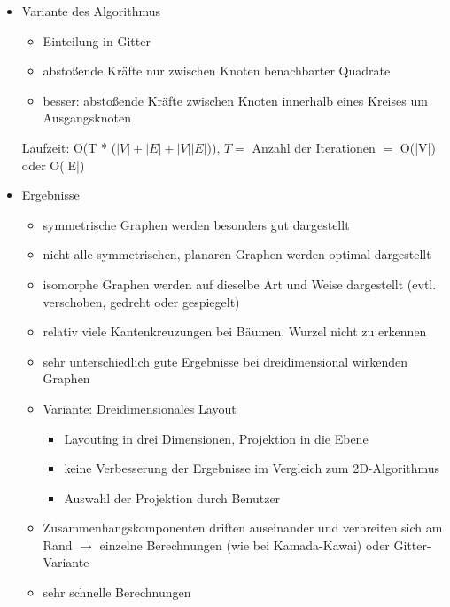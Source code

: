 \documentclass[a4paper,12pt,ngerman]{scrartcl}
\begin{document}
\begin{itemize}
\item Variante des Algorithmus
\begin{itemize}
\item Einteilung in Gitter
\item abstoßende Kräfte nur zwischen Knoten benachbarter Quadrate
\item besser: abstoßende Kräfte zwischen Knoten innerhalb eines Kreises um Ausgangsknoten
\end{itemize}

Laufzeit: O(T * ($|V| + |E| + |V||E|$)), $T =$ Anzahl der Iterationen $=$ O(|V|) oder O(|E|)
\item Ergebnisse
\begin{itemize}
\item symmetrische Graphen werden besonders gut dargestellt
\item nicht alle symmetrischen, planaren Graphen werden optimal dargestellt
\item isomorphe Graphen werden auf dieselbe Art und Weise dargestellt (evtl. verschoben, gedreht oder gespiegelt)
\item relativ viele Kantenkreuzungen bei Bäumen, Wurzel nicht zu erkennen
\item sehr unterschiedlich gute Ergebnisse bei dreidimensional wirkenden Graphen
\item Variante: Dreidimensionales Layout
\begin{itemize}
\item Layouting in drei Dimensionen, Projektion in die Ebene
\item keine Verbesserung der Ergebnisse im Vergleich zum 2D-Algorithmus
\item Auswahl der Projektion durch Benutzer
\end{itemize}
\item Zusammenhangskomponenten driften auseinander und verbreiten sich am Rand $\rightarrow$ einzelne Berechnungen (wie bei Kamada-Kawai) oder Gitter-Variante
\item sehr schnelle Berechnungen
\end{itemize}
\end{itemize}
\end{document}
